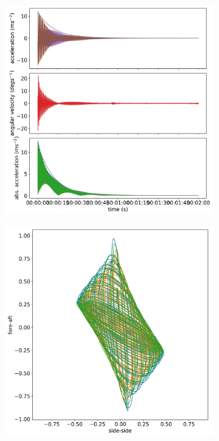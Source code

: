\documentclass{article}
\begin{document}
\begin{figure}[ht]

    \centering
    \begin{subfigure}[b]{0.45\textwidth}
        \centering
        \includegraphics[width=\textwidth]{results/experiment/low_mass_acceleration.png}
        \caption{}
        \label{fig:low-mass:acc}
    \end{subfigure}
    \begin{subfigure}[b]{0.45\textwidth}
        \centering
        \includegraphics[width=\textwidth]{results/experiment/low_mass_orbit.png}

\end{subfigure}
\end{figure}
\end{document}
